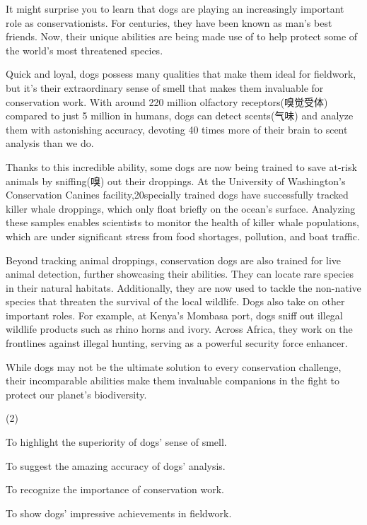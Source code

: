 \documentclass{英语试卷}
\begin{document}
\par It might surprise you to learn that dogs are playing an increasingly important role as conservationists. For centuries, they have been known as man's best friends. Now, their unique abilities are being made use of to help protect some of the world's most threatened species.\par
\par Quick and loyal, dogs possess many qualities that make them ideal for fieldwork, but it's their extraordinary sense of smell that makes them invaluable for conservation work. With around 220 million olfactory receptors(嗅觉受体) compared to just 5 million in humans, dogs can detect scents(气味) and analyze them with astonishing accuracy, devoting 40 times more of their brain to scent analysis than we do.\par
\par Thanks to this incredible ability, some dogs are now being trained to save at-risk animals by sniffing(嗅) out their droppings. At the University of Washington's Conservation Canines facility,20specially trained dogs have successfully tracked killer whale droppings, which only float briefly on the ocean's surface. Analyzing these samples enables scientists to monitor the health of killer whale populations, which are under significant stress from food shortages, pollution, and boat traffic.\par
\par Beyond tracking animal droppings, conservation dogs are also trained for live animal detection, further showcasing their abilities. They can locate rare species in their natural habitats. Additionally, they are now used to tackle the non-native species that threaten the survival of the local wildlife. Dogs also take on other important roles. For example, at Kenya's Mombasa port, dogs sniff out illegal wildlife products such as rhino horns and ivory. Across Africa, they work on the frontlines against illegal hunting, serving as a powerful security force enhancer.\par
\par While dogs may not be the ultimate solution to every conservation challenge, their incomparable abilities make them invaluable companions in the fight to protect our planet's biodiversity.\par
{}
\begin{choices}(2)
  \item To highlight the superiority of dogs' sense of smell.
  \item To suggest the amazing accuracy of dogs' analysis.
  \item To recognize the importance of conservation work.
  \item To show dogs' impressive achievements in fieldwork.
\end{choices}
\end{document}
